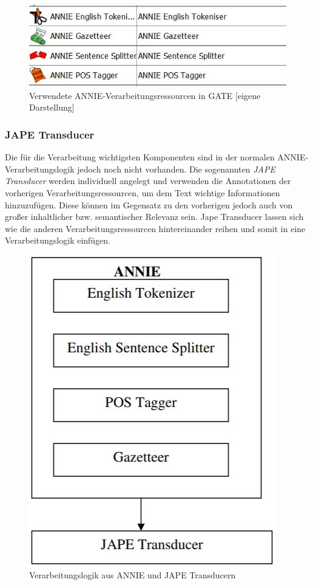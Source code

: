 \documentclass[12pt]{report}
\begin{document}
\begin{figure}[H]
\begin{center}
\includegraphics[scale=0.9]{Bilder/ANNIEinGATE.jpg}
\caption{Verwendete ANNIE-Verarbeitungsressourcen in GATE [eigene Darstellung]}
\end{center}
\end{figure}   

\subsubsection{JAPE Transducer}

Die für die Verarbeitung wichtigsten Komponenten sind in der normalen ANNIE-Verarbeitungslogik jedoch noch nicht vorhanden. Die sogenannten \textit{JAPE Transducer} werden individuell angelegt und verwenden die Annotationen der vorherigen Verarbeitungsressourcen, um dem Text wichtige Informationen hinzuzufügen. Diese können im Gegensatz zu den vorherigen jedoch auch von großer inhaltlicher bzw. semantischer Relevanz sein. Jape Transducer lassen sich wie die anderen Verarbeitungsressourcen hintereinander reihen und somit in eine Verarbeitungslogik einfügen.

\begin{figure}[H]
\begin{center}
\includegraphics[scale=0.7]{Bilder/ANNIE-Pipeline.jpg}
\caption{Verarbeitungslogik aus ANNIE und JAPE Transducern \cite{tol09}}
\end{center}
\end{figure}   
\end{document}
